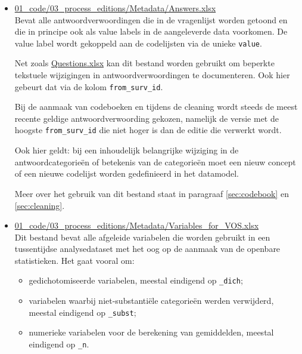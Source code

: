 \documentclass{VSAnote}
\begin{document}
\begin{itemize}
\item \url{01_code/03_process_editions/Metadata/Answers.xlsx}\\
Bevat alle antwoordverwoordingen die in de vragenlijst worden getoond en die in principe ook als value labels in de aangeleverde data voorkomen. De value label wordt gekoppeld aan de codelijsten via de unieke \verb+value+.

Net zoals \url{Questions.xlsx} kan dit bestand worden gebruikt om beperkte tekstuele wijzigingen in antwoordverwoordingen te documenteren. Ook hier gebeurt dat via de kolom \verb+from_surv_id+.

Bij de aanmaak van codeboeken en tijdens de cleaning wordt steeds de meest recente geldige antwoordverwoording gekozen, namelijk de versie met de hoogste \verb+from_surv_id+ die niet hoger is dan de editie die verwerkt wordt.

Ook hier geldt: bij een inhoudelijk belangrijke wijziging in de antwoordcategorieën of betekenis van de categorieën moet een nieuw concept of een nieuwe codelijst worden gedefinieerd in het datamodel.

Meer over het gebruik van dit bestand staat in paragraaf \ref{sec:codebook} en \ref{sec:cleaning}.

\item \url{01_code/03_process_editions/Metadata/Variables_for_VOS.xlsx}\\
Dit bestand bevat alle afgeleide variabelen die worden gebruikt in een tussentijdse analysedataset met het oog op de aanmaak van de openbare statistieken. Het gaat vooral om:
\begin{itemize}
\item gedichotomiseerde variabelen, meestal eindigend op \verb+_dich+;
\item variabelen waarbij niet-substantiële categorieën werden verwijderd, meestal eindigend op \verb+_subst+;
\item numerieke variabelen voor de berekening van gemiddelden, meestal eindigend op \verb+_n+.
\end{itemize}


\end{itemize}
\end{document}

